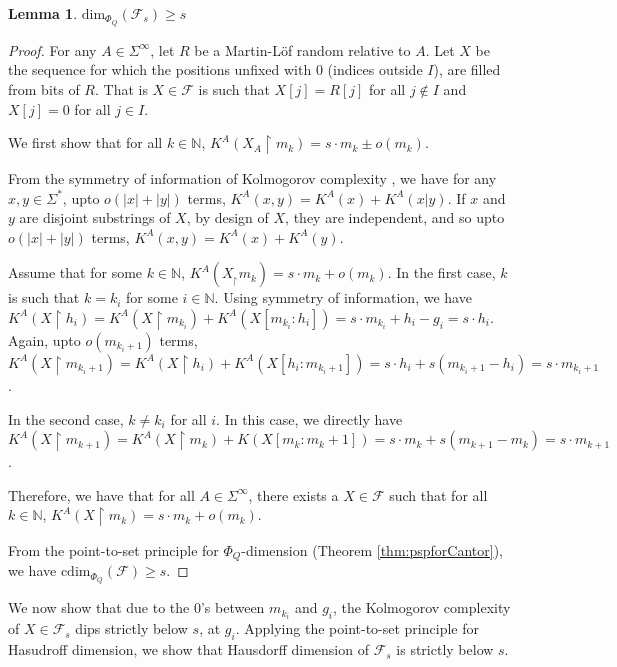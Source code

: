 \documentclass[11pt]{article}
\newtheorem{lemma}{Lemma}
\newcommand{\restr}{\upharpoonright}
\newcommand{\N}{\mathbb{N}}
\newcommand{\cdim}{\mathrm{cdim}}
\renewcommand{\dim}{{\mathrm{dim}}}
\newcommand{\F}{{\mathcal{F}}}
\renewcommand{\F}{\mathcal{F}}
\begin{document}
\begin{lemma}\label{lem:dimQF_sgts}
		$\dim_{\Phi_Q}(\F_s) \geq s$
\end{lemma}
\begin{proof}
	
	For any $A \in \Sigma^\infty$, let $R$ be a Martin-L\"of random relative to $A$. Let $X$ be the sequence for which the positions unfixed with 0 (indices outside $I$), are filled from bits of $R$. That is
	$X \in \F$ is such that $X[j] = R[j]$ for all $j \not\in I$ and $X[j] = 0$ for all $j \in I$. 
	
	
		We first show that
		for all $k \in \N$, $K^A(X_A\restr m_{k}) = s \cdot m_{k} \pm o(m_k).$
		
	From the symmetry of information of Kolmogorov complexity \cite{Downey10}, we have for any $x, y \in \Sigma^*$, upto $o(|x| + |y|)$ terms, $K^A(x,y) = K^A(x) + K^A(x | y)$.
	If $x$ and $y$ are disjoint substrings of $X$, by design of $X$, they are independent, and so upto $o(|x| + |y|)$ terms, $K^A(x,y) = K^A(x) + K^A(y)$.
	
	
	
	Assume that for some $k \in \N$, $K^A(X_ \restr m_k) = s\cdot m_k + o(m_k)$.  In the first case, $k$ is such that $k = k_i$ for some $i \in \N$. Using symmetry of information, we have 
	$K^A(X \restr h_i) = K^A(X \restr m_{k_i}) + K^A(X[m_{k_i} : h_i]) = s \cdot m_{k_i} + h_i - g_i = s \cdot h_i$. Again,  upto $o(m_{k_i + 1})$ terms, $K^A(X \restr m_{k_i + 1}) = K^A(X \restr h_i) + K^A(X [h_i : m_{k_i + 1}]) = s \cdot h_i + s (m_{k_i + 1} - h_i) = s \cdot m_{k_i + 1}$. 
	
	In the second case, $k \neq k_i$ for all $i$. In this case, we directly have $K^A(X \restr m_{k+1}) = K^A(X \restr m_k) + K(X[m_k : m_k+1]) = s \cdot m_{k} + s (m_{k+1} - m_k) = s \cdot m_{k+1}$.
	
	Therefore, we have that for all $A \in \Sigma^\infty$, there exists a $X \in \F$ such that for all $k \in \N$, $K^A(X \restr m_k) = s \cdot m_k + o(m_k)$. 
	
	From the point-to-set principle  for $\Phi_Q$-dimension (Theorem \ref{thm:pspforCantor}), we have $\cdim_{\Phi_Q}(\F) \geq s$.
\end{proof}

	We now show that due to the $0$'s between $m_{k_i}$ and $g_i$, the Kolmogorov complexity of $X \in \F_s$ dips strictly below $s$, at $g_i$. Applying the point-to-set principle for Hasudroff dimension, we show that Hausdorff dimension of $\F_s$ is strictly below $s$.
	
\end{document}
